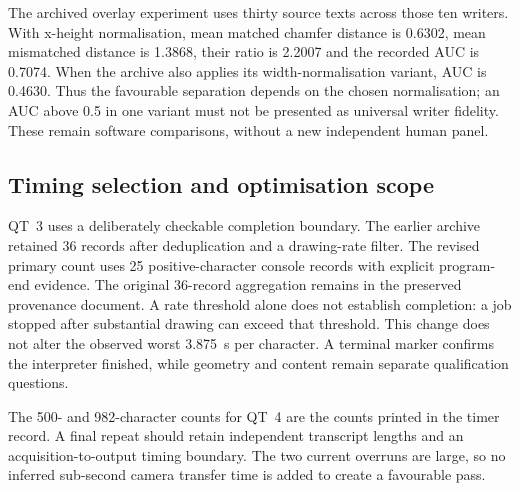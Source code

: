 The archived overlay experiment uses thirty source texts across those ten writers. With x-height normalisation, mean matched chamfer distance is 0.6302, mean mismatched distance is 1.3868, their ratio is 2.2007 and the recorded AUC is 0.7074. When the archive also applies its width-normalisation variant, AUC is 0.4630. Thus the favourable separation depends on the chosen normalisation; an AUC above 0.5 in one variant must not be presented as universal writer fidelity. These remain software comparisons, without a new independent human panel.

\subsection{Timing selection and optimisation scope}
\label{app:res-speed}
QT~3 uses a deliberately checkable completion boundary. The earlier archive retained 36 records after deduplication and a drawing-rate filter. The revised primary count uses 25 positive-character console records with explicit program-end evidence. The original 36-record aggregation remains in the preserved provenance document. A rate threshold alone does not establish completion: a job stopped after substantial drawing can exceed that threshold. This change does not alter the observed worst 3.875~s per character. A terminal marker confirms the interpreter finished, while geometry and content remain separate qualification questions.

The 500- and 982-character counts for QT~4 are the counts printed in the timer record. A final repeat should retain independent transcript lengths and an acquisition-to-output timing boundary. The two current overruns are large, so no inferred sub-second camera transfer time is added to create a favourable pass.


